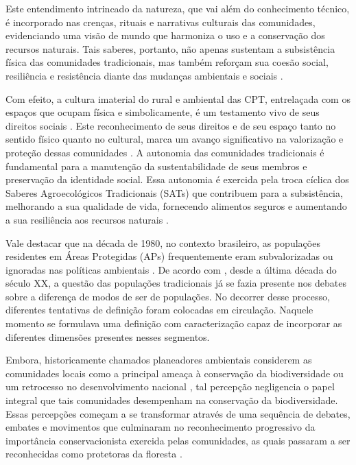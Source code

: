 Este entendimento intrincado da natureza, que vai além do conhecimento técnico, é incorporado nas crenças, rituais e narrativas culturais das comunidades, evidenciando uma visão de mundo que harmoniza o uso e a conservação dos recursos naturais. Tais saberes, portanto, não apenas sustentam a subsistência física das comunidades tradicionais, mas também reforçam sua coesão social, resiliência e resistência diante das mudanças ambientais e sociais \cite{Brzi2023}.

Com efeito, a cultura imaterial do rural e ambiental das CPT, entrelaçada com os espaços que ocupam física e simbolicamente, é um testamento vivo de seus direitos sociais \cite{BobatoStadler2020}. Este reconhecimento de seus direitos e de seu espaço tanto no sentido físico quanto no cultural, marca um avanço significativo na valorização e proteção dessas comunidades \cite{Colao2011}.
A autonomia das comunidades tradicionais é fundamental para a manutenção da sustentabilidade de seus membros e preservação da identidade social. Essa autonomia é exercida pela troca cíclica dos Saberes Agroecológicos Tradicionais (SATs) que contribuem para a subsistência, melhorando a sua qualidade de vida, fornecendo alimentos seguros e aumentando a sua resiliência aos recursos naturais \cite{MohdSalim2023}. 

Vale destacar que na década de 1980, no contexto brasileiro, as populações residentes em Áreas Protegidas (APs) frequentemente eram subvalorizadas ou ignoradas nas políticas ambientais \cite{Marques2016}. De acordo com , desde a última década do século XX, a questão das populações tradicionais já se fazia presente nos debates sobre a diferença de modos de ser de populações. No decorrer desse processo, diferentes tentativas de definição foram colocadas em circulação. Naquele momento se formulava uma definição com caracterização capaz de incorporar as diferentes dimensões presentes nesses segmentos.

Embora, historicamente chamados planeadores ambientais considerem as comunidades locais como a principal ameaça à conservação da biodiversidade ou um retrocesso no desenvolvimento nacional \cite{Singh2000}, tal percepção negligencia o papel integral que tais comunidades desempenham na conservação da biodiversidade. Essas percepções começam a se transformar através de uma sequência de debates, embates e movimentos que culminaram no reconhecimento progressivo da importância conservacionista exercida pelas comunidades, as quais passaram a ser reconhecidas como protetoras da floresta \cite{Asante2017}.


